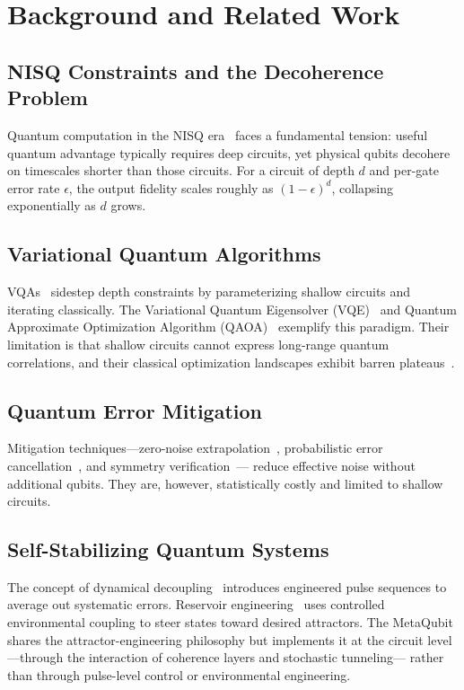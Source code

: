 \documentclass[twocolumn,amsmath,amssymb,prl]{revtex4-2}
\begin{document}
\section{Background and Related Work}
\label{sec:background}

\subsection{NISQ Constraints and the Decoherence Problem}

Quantum computation in the NISQ era~\cite{Preskill2018} faces a fundamental
tension: useful quantum advantage typically requires deep circuits, yet physical
qubits decohere on timescales shorter than those circuits.  For a circuit of
depth $d$ and per-gate error rate $\epsilon$, the output fidelity scales roughly
as $(1-\epsilon)^d$, collapsing exponentially as $d$ grows.

\subsection{Variational Quantum Algorithms}

VQAs~\cite{Cerezo2021,Farhi2014} sidestep depth constraints by parameterizing
shallow circuits and iterating classically.  The Variational Quantum
Eigensolver (VQE)~\cite{Peruzzo2014} and Quantum Approximate Optimization
Algorithm (QAOA)~\cite{Farhi2014} exemplify this paradigm.  Their limitation
is that shallow circuits cannot express long-range quantum correlations, and
their classical optimization landscapes exhibit barren plateaus~\cite{McClean2018}.

\subsection{Quantum Error Mitigation}

Mitigation techniques—zero-noise extrapolation~\cite{Temme2017}, probabilistic
error cancellation~\cite{Endo2018}, and symmetry verification~\cite{McArdle2019}—
reduce effective noise without additional qubits.  They are, however, statistically
costly and limited to shallow circuits.

\subsection{Self-Stabilizing Quantum Systems}

The concept of dynamical decoupling~\cite{Viola1998} introduces engineered pulse
sequences to average out systematic errors.  Reservoir engineering~\cite{Poyatos1996}
uses controlled environmental coupling to steer states toward desired attractors.
The MetaQubit shares the attractor-engineering philosophy but implements it at the
circuit level—through the interaction of coherence layers and stochastic tunneling—
rather than through pulse-level control or environmental engineering.
\end{document}
